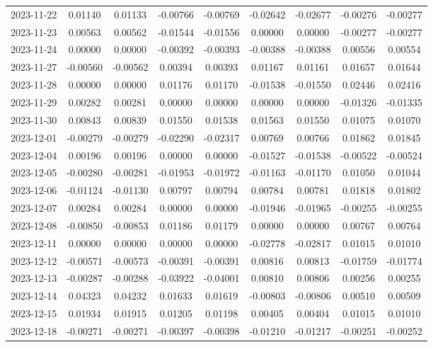 \begin{footnotesize}
\begin{longtable}{lcccccccc}
2023-11-22 & 0.01140 & 0.01133 & -0.00766 & -0.00769 & -0.02642 & -0.02677 & -0.00276 & -0.00277 \\
2023-11-23 & 0.00563 & 0.00562 & -0.01544 & -0.01556 & 0.00000 & 0.00000 & -0.00277 & -0.00277 \\
2023-11-24 & 0.00000 & 0.00000 & -0.00392 & -0.00393 & -0.00388 & -0.00388 & 0.00556 & 0.00554 \\
2023-11-27 & -0.00560 & -0.00562 & 0.00394 & 0.00393 & 0.01167 & 0.01161 & 0.01657 & 0.01644 \\
2023-11-28 & 0.00000 & 0.00000 & 0.01176 & 0.01170 & -0.01538 & -0.01550 & 0.02446 & 0.02416 \\
2023-11-29 & 0.00282 & 0.00281 & 0.00000 & 0.00000 & 0.00000 & 0.00000 & -0.01326 & -0.01335 \\
2023-11-30 & 0.00843 & 0.00839 & 0.01550 & 0.01538 & 0.01563 & 0.01550 & 0.01075 & 0.01070 \\
2023-12-01 & -0.00279 & -0.00279 & -0.02290 & -0.02317 & 0.00769 & 0.00766 & 0.01862 & 0.01845 \\
2023-12-04 & 0.00196 & 0.00196 & 0.00000 & 0.00000 & -0.01527 & -0.01538 & -0.00522 & -0.00524 \\
2023-12-05 & -0.00280 & -0.00281 & -0.01953 & -0.01972 & -0.01163 & -0.01170 & 0.01050 & 0.01044 \\
2023-12-06 & -0.01124 & -0.01130 & 0.00797 & 0.00794 & 0.00784 & 0.00781 & 0.01818 & 0.01802 \\
2023-12-07 & 0.00284 & 0.00284 & 0.00000 & 0.00000 & -0.01946 & -0.01965 & -0.00255 & -0.00255 \\
2023-12-08 & -0.00850 & -0.00853 & 0.01186 & 0.01179 & 0.00000 & 0.00000 & 0.00767 & 0.00764 \\
2023-12-11 & 0.00000 & 0.00000 & 0.00000 & 0.00000 & -0.02778 & -0.02817 & 0.01015 & 0.01010 \\
2023-12-12 & -0.00571 & -0.00573 & -0.00391 & -0.00391 & 0.00816 & 0.00813 & -0.01759 & -0.01774 \\
2023-12-13 & -0.00287 & -0.00288 & -0.03922 & -0.04001 & 0.00810 & 0.00806 & 0.00256 & 0.00255 \\
2023-12-14 & 0.04323 & 0.04232 & 0.01633 & 0.01619 & -0.00803 & -0.00806 & 0.00510 & 0.00509 \\
2023-12-15 & 0.01934 & 0.01915 & 0.01205 & 0.01198 & 0.00405 & 0.00404 & 0.01015 & 0.01010 \\
2023-12-18 & -0.00271 & -0.00271 & -0.00397 & -0.00398 & -0.01210 & -0.01217 & -0.00251 & -0.00252 \\

\end{longtable}
\end{footnotesize}
